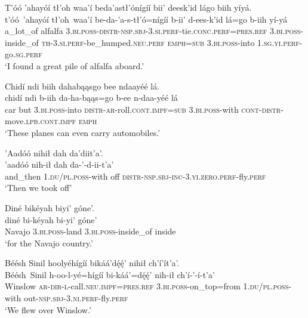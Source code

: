 \ea\label{ex:text9-2-10}
T’óó ’ahayóí tł’oh waa’í beda’astł’ónígíí bii’ deesk’id lágo biih yíyá.\\
\gll t’óó~{’ahayóí}	tł’oh~{waa’í}	be-da-’a-s-tł’ó=nígíí	b-ii’	d-ees-k’id	lá=go	b-iih	yí-yá\\
     a\_lot\_of	alfalfa	3.\textsc{bi}.\textsc{poss}-\textsc{distr}-\textsc{nsp}.\textsc{sbj}-3.\textsc{si}.\textsc{perf}-tie.\textsc{conc}.\textsc{perf}=\textsc{pres}.\textsc{ref}	3.\textsc{bi}.\textsc{poss}-inside\_of	\textsc{th}-3.\textsc{si}.\textsc{perf}-be\_humped.\textsc{neu}.\textsc{perf}	\textsc{emph}=\textsc{sub}	3.\textsc{bi}.\textsc{poss}-into	1.\textsc{sg}.\textsc{yi}.\textsc{perf}-go.\textsc{sg}.\textsc{perf}\\
\glt `I found a great pile of alfalfa aboard.'
\z

\ea\label{ex:text9-2-11}
Chidí ndi biih dahabąąsgo bee ndaayéé lá.\\
\gll chidí	ndi	b-iih	da-ha-bąąs=go	b-ee	n-daa-yéé	lá\\
     car	but	3.\textsc{bi}.\textsc{poss}-into	\textsc{distr}-\textsc{ar}-roll.\textsc{cont}.\textsc{impf}=\textsc{sub}	3.\textsc{bi}.\textsc{poss}-with	\textsc{cont}-\textsc{distr}-move.\textsc{lpb}.\textsc{cont}.\textsc{impf}	\textsc{emph}\\
\glt `These planes can even carry automobiles.'
\z

\ea\label{ex:text9-3-1}
’Aadóó nihił dah da’diit’a’.\\
\gll ’aadóó	nih-ił	dah	da-’-d-ii-t’a’\\
     and\_then	1.\textsc{du}/\textsc{pl}.\textsc{poss}-with	off	\textsc{distr}-\textsc{nsp}.\textsc{sbj}-\textsc{inc}-3.\textsc{yi}.\textsc{zero}.\textsc{perf}-fly.\textsc{perf}\\
\glt `Then we took off'
\z

\newpage
\ea\label{ex:text9-3-2}
Diné bikéyah biyi’ góne’.\\
\gll diné	bi-kéyah	bi-yi’	góne’\\
     Navajo	3.\textsc{bi}.\textsc{poss}-land	3.\textsc{bi}.\textsc{poss}-inside\_of	inside\\
\glt `for the Navajo country.'
\z

\ea\label{ex:text9-3-3}
Béésh Sinil hoolyéhígíí bikáá’dę́ę́’ nihił ch’í’ít’a’.\\
\gll Béésh~{Sinil}	h-oo-l-yé=hígíí	bi-káá’=dę́ę́’	nih-ił	ch’í-’-í-t’a’\\
     Winslow	\textsc{ar}-\textsc{dir}-\textsc{l}-call.\textsc{neu}.\textsc{impf}=\textsc{pres}.\textsc{ref}	3.\textsc{bi}.\textsc{poss}-on\_top=from	1.\textsc{du}/\textsc{pl}.\textsc{poss}-with	out-\textsc{nsp}.\textsc{sbj}-3.\textsc{ni}.\textsc{perf}-fly.\textsc{perf}\\
\glt `We flew over Winslow.'
\z

